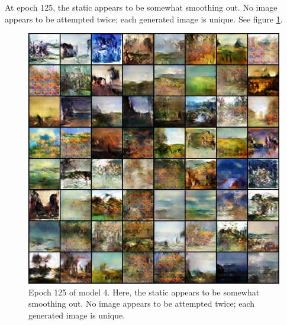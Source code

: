 \documentclass[11pt,letterpaper]{article}
\begin{document}
				At epoch 125, the static appears to be somewhat smoothing out.
				No image appears to be attempted twice; each generated image is unique.
				See figure \ref{fig:wa64:epoch125generator}.
				\begin{figure}
					\centering
					\includegraphics[width=1.0\linewidth]{results/model4/epoch125_generator}
					\caption{Epoch 125 of model 4. Here, the static appears to be somewhat smoothing out. No image appears to be attempted twice; each generated image is unique.}
					\label{fig:wa64:epoch125generator}
				\end{figure}
\end{document}
